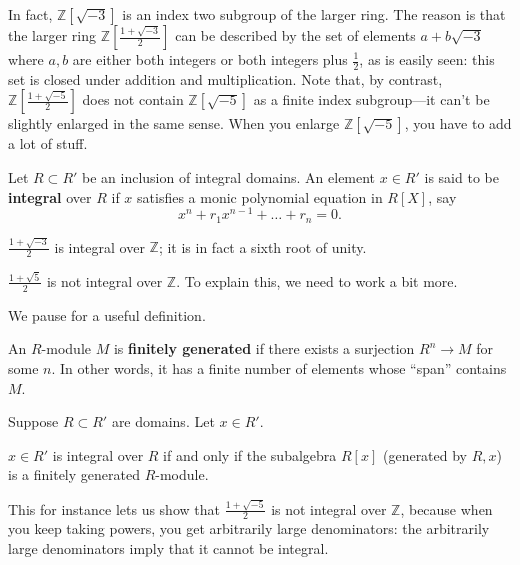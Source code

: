 In fact, $\mathbb{Z}[\sqrt{-3}]$ is an index two subgroup of the larger ring.  
The reason is that the larger ring $\mathbb{Z}[ \frac{1 + \sqrt{-3}}{2}]$ can be described by the set of elements $a +
b\sqrt{-3}$ where $a,b$ are either both integers or both integers plus
$\frac{1}{2}$, as is easily seen: this set is closed under addition and
multiplication.  
Note that, by contrast, $\mathbb{Z}[ \frac{1 + \sqrt{-5}}{2}]$ does not
contain $\mathbb{Z}[\sqrt{-5}]$ as a finite index subgroup---it can't be
slightly enlarged in the same sense. When you enlarge $\mathbb{Z}[\sqrt{-5}]$,
you have to add a lot of stuff.

\begin{definition} Let $R \subset R'$ be an inclusion of integral domains. An
element $x \in R'$ is said to be \textbf{integral} over $R$ if $x$ satisfies a
monic polynomial equation in $R[X]$, say \[ x^n + r_1 x^{n-1} + \dots + r_n =
0. \] \end{definition}

\begin{example} 
$\frac{1+\sqrt{-3}}{2}$ is integral over $\mathbb{Z}$; it is in fact a sixth
root of unity.
\end{example} 

\begin{example} 
$\frac{1+\sqrt{5}}{2}$ is not integral over $\mathbb{Z}$. To explain this, we
need to work a bit more.
\end{example} 

We pause for a useful definition.
\begin{definition} 
An $R$-module $M$ is \textbf{finitely generated} if there exists a surjection
$R^n \to M$ for some $n$. In other words, it has a finite number of elements
whose ``span'' contains $M$.
\end{definition} 


Suppose $R \subset R'$ are domains.  Let $x \in R'$.  

\begin{proposition} 
$x \in R'$ is integral over $R$ if and only if the subalgebra $R[x]$
(generated by $R, x$) is a finitely generated
$R$-module.
\end{proposition} 

This for instance lets us show that $\frac{1+\sqrt{-5}}{2}$ is not integral
over $\mathbb{Z}$, because when you keep taking powers, you get arbitrarily
large denominators: the arbitrarily large denominators imply that it cannot be
integral.

